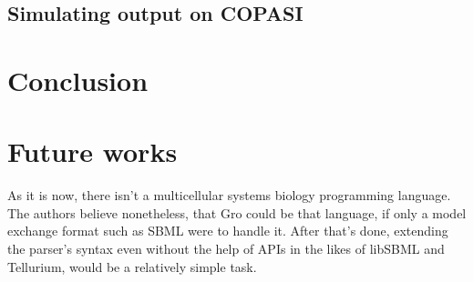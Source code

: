 \documentclass[12pt]{article}
\begin{document}
\subsection{Simulating output on COPASI}
    \lipsum[1]

\section{Conclusion}
    \lipsum[1]
    
\section{Future works}
    As it is now, there isn't a multicellular systems biology programming language. The authors believe nonetheless, that Gro could be that language, if only a model exchange format such as SBML were to handle it. After that's done, extending the parser's syntax even without the help of APIs in the likes of libSBML and Tellurium, would be a relatively simple task.



\end{document}
